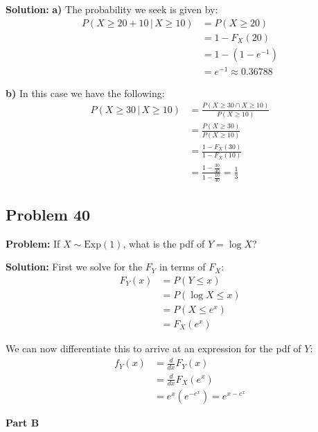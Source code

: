 \documentclass{article}
\newcommand*\pbar[0]{\,|\,}
\begin{document}
\noindent\textbf{Solution:} \textbf{a)} The probability we seek is given by:
\begin{align*}
    P(X\ge 20+10\pbar X\ge 10)&=P(X\ge 20)\tag{memorylessness}\\
    &=1-F_X(20)\tag{complement \& def. of cdf}\\
    &=1-(1-e^{-1})\tag{cdf of exponential distribution}\\
    &=e^{-1}\approx0.36788
\end{align*}

\textbf{b)} In this case we have the following:
\begin{align*}
    P(X\ge 30\pbar X\ge 10)&=\frac{P(X\ge30\cap X\ge10)}{P(X\ge10)}\tag{conditional probability}\\
    &=\frac{P(X\ge30)}{P(X\ge10)}\tag{$30\ge10$}\\
    &=\frac{1-F_X(30)}{1-F_X(10)}\tag{complement \& def. of cdf}\\
    &=\frac{1-\frac{30}{40}}{1-\frac{10}{40}}=\frac{1}{3}\tag{cdf of uniform distribution}
\end{align*}

\subsection*{Problem 40}
\noindent\textbf{Problem:} If $X\sim \text{Exp}(1)$, what is the pdf of $Y=\log X$?
\bigskip

\noindent\textbf{Solution:} First we solve for the $F_Y$ in terms of $F_X$:
\begin{align*}
    F_Y(x)&=P(Y\le x)\tag{def. of cdf}\\
    &=P(\log X\le x)\tag{def. of $Y$}\\
    &=P(X\le e^x)\tag{$e^x$ is monotonoically increasing}\\
    &=F_X(e^x)\tag{def. of cdf}
\end{align*} 

We can now differentiate this to arrive at an expression for the pdf of $Y$:
\begin{align*}
    f_Y(x)&=\frac{d}{dx}F_Y(x)\tag{def. of pdf}\\
    &=\frac{d}{dx}F_X(e^x)\\
    &=e^x(e^{-e^x})=e^{x-e^x}\tag{chain rule}
\end{align*}
\smallskip

\begin{center}
    \Large{\textbf{Part B}}
\end{center}
\end{document}
